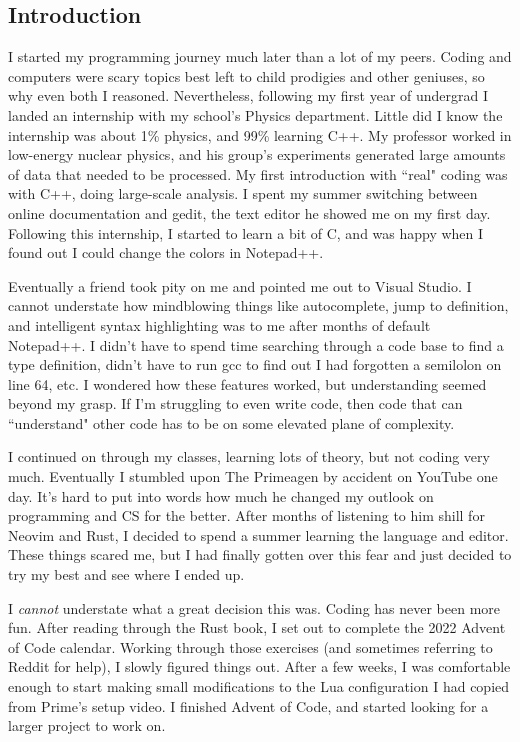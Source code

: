 \subsection{Introduction}

I started my programming journey much later than a lot of my peers. Coding and computers were scary topics best left to child prodigies and other geniuses, so why even both I reasoned. Nevertheless, following my first year of undergrad I landed an internship with my school's Physics department. Little did I know the internship was about 1\% physics, and 99\% learning C++. My professor worked in low-energy nuclear physics, and his group's experiments generated large amounts of data that needed to be processed. My first introduction with ``real" coding  was with C++, doing large-scale analysis. I spent my summer switching between online documentation and gedit, the text editor he showed me on my first day. Following this internship, I started to learn a bit of C, and was happy when I found out I could change the colors in Notepad++.

Eventually a friend took pity on me and pointed me out to Visual Studio.  I cannot understate how mindblowing things like autocomplete, jump to definition,  and intelligent syntax highlighting was to me after months of default Notepad++. I didn't have to spend time searching through a code base to find a type definition, didn't have to run gcc to find out I had forgotten a semilolon on line 64, etc. I wondered how these features worked, but understanding seemed beyond my grasp.  If I'm struggling to even write code, then code that can ``understand" other code  has to be on some elevated plane of complexity.

I continued on through my classes, learning lots of theory, but not coding very much. Eventually I stumbled upon The Primeagen by accident on YouTube one day. It's hard to put into words how much he changed my outlook on programming and CS for  the better. After months of listening to him shill for Neovim and Rust, I decided to spend a summer learning the language and editor. These things scared me, but I had finally gotten over this fear and just decided to try my best and see where I ended up. 

I \textit{cannot} understate what a great decision this was. Coding has never been more fun. After reading through the Rust book, I set out to complete the 2022 Advent of Code calendar.  Working through those exercises (and sometimes referring to Reddit for help), I slowly figured things out. After a few weeks, I was comfortable enough to start making small modifications to the Lua configuration I had copied from  Prime's setup video. I finished Advent of Code, and started looking for a larger project to work on.

